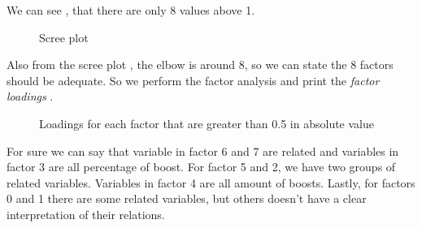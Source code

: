 We can see , that there are only 8 values above 1.

\begin{figure}[H]
    \label{fig:scree}
    \caption{Scree plot} 
\end{figure}

Also from the scree plot , the elbow is around 8, so we can state the 8 factors should be adequate.
So we perform the factor analysis and print the \textit{factor loadings} .

\begin{figure}[H]
    \label{fig:loadings}
    \caption{Loadings for each factor that are greater than 0.5 in absolute value} 
\end{figure}

For sure we can say that variable in factor 6 and 7 are related and variables in factor 3 are all percentage of boost. For factor 5 and 2, we have two groups of related variables. Variables in factor 4 are all amount of boosts. Lastly, for factors 0 and 1 there are some related variables, but others doesn't have a clear interpretation of their relations.

